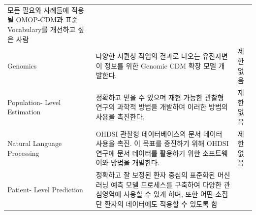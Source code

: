 \documentclass[11pt]{book}
\theoremstyle{definition}
\theoremstyle{definition}
\theoremstyle{definition}
\theoremstyle{remark}
\begin{document}
\begin{longtable}[]{@{}lll@{}}
\begin{minipage}[t]{0.37\columnwidth}
모든 필요와 사례들에 적용될 OMOP-CDM과 표준 Vocabulary를 개선하고 싶은
사람\strut
\end{minipage}\tabularnewline
\begin{minipage}[t]{0.11\columnwidth}\raggedright\strut
Genomics\strut
\end{minipage} & \begin{minipage}[t]{0.44\columnwidth}\raggedright\strut
다양한 시퀀싱 작업의 결과로 나오는 유전자변이 정보를 위한 Genomic CDM
확장 모델 개발한다.\strut
\end{minipage} & \begin{minipage}[t]{0.37\columnwidth}\raggedright\strut
제한 없음\strut
\end{minipage}\tabularnewline
\begin{minipage}[t]{0.11\columnwidth}\raggedright\strut
Population- Level Estimation\strut
\end{minipage} & \begin{minipage}[t]{0.44\columnwidth}\raggedright\strut
정확하고 믿을 수 있으며 재현 가능한 관찰형 연구의 과학적 방법을 개발하며
이러한 방법의 사용을 촉진한다.\strut
\end{minipage} & \begin{minipage}[t]{0.37\columnwidth}\raggedright\strut
제한 없음\strut
\end{minipage}\tabularnewline
\begin{minipage}[t]{0.11\columnwidth}\raggedright\strut
Natural Language Processing\strut
\end{minipage} & \begin{minipage}[t]{0.44\columnwidth}\raggedright\strut
OHDSI 관찰형 데이터베이스의 문서 데이터 사용을 촉진. 이 목표를 증진하기
위해 OHDSI 연구에 문서 데이터를 활용하기 위한 소프트웨어와 방법을
개발한다.\strut
\end{minipage} & \begin{minipage}[t]{0.37\columnwidth}\raggedright\strut
제한 없음\strut
\end{minipage}\tabularnewline
\begin{minipage}[t]{0.11\columnwidth}\raggedright\strut
Patient- Level Prediction\strut
\end{minipage} & \begin{minipage}[t]{0.44\columnwidth}\raggedright\strut
정확하고 잘 보정된 환자 중심의 표준화된 머신러닝 예측 모델 프로세스를
구축하여 다양한 관심영역에 사용할 수 있게 하며, 또한 어떤 소집단 환자의
데이터에도 적용할 수 있도록 함\strut
\end{minipage} & \begin{minipage}[t]{0.37\columnwidth}\raggedright\strut

\end{minipage}
\end{longtable}
\end{document}

